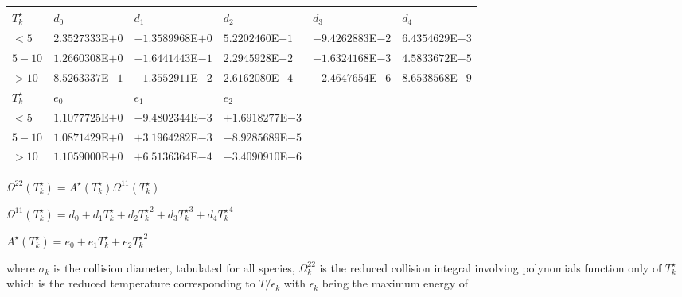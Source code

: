 \documentclass{warpdoc}
\renewcommand{\fontsizetable}{\footnotesize\scalefont{1.0}}
\begin{document}
\begin{table*}[|t]
\fontsizetable
\begin{center}
  \begin{threeparttable}
    \fontsizetable
    \begin{tabular*}{\textwidth}{@{\extracolsep{\fill}}llllll}
      \toprule
$T^\star_k$& $d_0$          & $d_1$           & $d_2$          & $d_3$           & $d_4$ \\
\midrule
$<5$       & $2.3527333$E$+0$ & $-1.3589968$E$+0$ & $5.2202460$E$-1$ & $-9.4262883$E$-2$ & $6.4354629$E$-3$ \\
$5-10$     & $1.2660308$E$+0$ & $-1.6441443$E$-1$ & $2.2945928$E$-2$ & $-1.6324168$E$-3$ & $4.5833672$E$-5$ \\
$>10$      & $8.5263337$E$-1$ & $-1.3552911$E$-2$ & $2.6162080$E$-4$ & $-2.4647654$E$-6$ & $8.6538568$E$-9$ \\
\midrule
$T^\star_k$& $e_0$          & $e_1$           & $e_2$           &~&~\\
\midrule
$<5$       & $1.1077725$E$+0$ & $-9.4802344$E$-3$ & $+1.6918277$E$-3$ &~&~ \\
$5-10$     & $1.0871429$E$+0$ & $+3.1964282$E$-3$ & $-8.9285689$E$-5$ &~& ~\\
$>10$      & $1.1059000$E$+0$ & $+6.5136364$E$-4$ & $-3.4090910$E$-6$ &~&~ \\
      \bottomrule
    \end{tabular*}
    \label{table:species-Omega}
    \begin{tablenotes}
      \item  $\Omega^{22}(T^\star_k)= A^\star (T^\star_k) \Omega^{11}(T^\star_k)$ 
      \item  $\Omega^{11}(T^\star_k)=d_0+d_1 {T^\star_k}+d_2 {T^\star_k}^2+d_3 {T^\star_k}^3+d_4 {T^\star_k}^4$ 
      \item  $A^\star (T^\star_k)=e_0+e_1 {T^\star_k}+e_2 {T^\star_k}^2$ 
    \end{tablenotes}
  \end{threeparttable}
\end{center}
\end{table*}
%
where $\sigma_k$ is the collision diameter, tabulated for all species,
$\Omega^{22}_k$ is the reduced
collision integral involving polynomials function only of
$T^\star_k$
which is the reduced temperature corresponding to
$T/ \epsilon_k$ with $\epsilon_k$ being the maximum energy of
\end{document}
